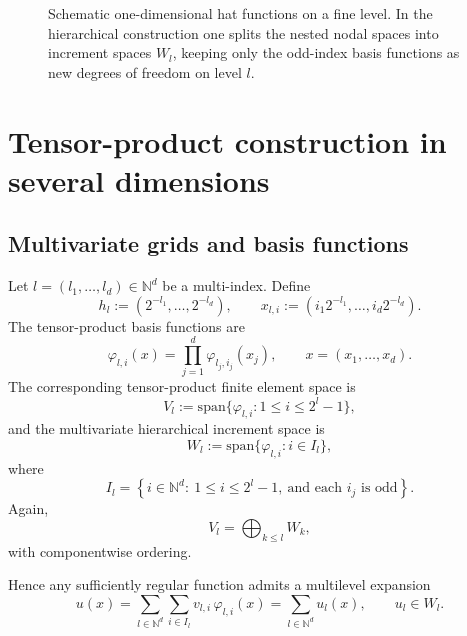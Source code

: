 \documentclass[11pt,a4paper]{report}
\begin{document}
\begin{figure}[ht]
\centering
{}
\caption{Schematic one-dimensional hat functions on a fine level. In the hierarchical construction one splits the nested nodal spaces into increment spaces $W_l$, keeping only the odd-index basis functions as new degrees of freedom on level $l$.}
\label{fig:1d-hats}
\end{figure}

\section{Tensor-product construction in several dimensions}

\subsection{Multivariate grids and basis functions}

Let $l=(l_1,\dots,l_d)\in\mathbb{N}^d$ be a multi-index. Define
$$
h_l := (2^{-l_1},\dots,2^{-l_d}),
\qquad
x_{l,i} := (i_1 2^{-l_1},\dots,i_d 2^{-l_d}).
$$
The tensor-product basis functions are
$$
\varphi_{l,i}(x)
=
\prod_{j=1}^d \varphi_{l_j,i_j}(x_j),
\qquad x=(x_1,\dots,x_d).
$$
The corresponding tensor-product finite element space is
$$
V_l := \mathrm{span}\{\varphi_{l,i}: 1\le i \le 2^l-1\},
$$
and the multivariate hierarchical increment space is
$$
W_l := \mathrm{span}\{\varphi_{l,i}: i\in I_l\},
$$
where
$$
I_l
=
\left\{
i\in\mathbb{N}^d:\ 1\le i \le 2^l-1,\ \text{and each } i_j \text{ is odd}
\right\}.
$$
Again,
$$
V_l = \bigoplus_{k\le l} W_k,
$$
with componentwise ordering.

Hence any sufficiently regular function admits a multilevel expansion
$$
u(x)
=
\sum_{l\in\mathbb{N}^d} \sum_{i\in I_l} v_{l,i}\,\varphi_{l,i}(x)
=
\sum_{l\in\mathbb{N}^d} u_l(x),
\qquad
u_l\in W_l.
$$
\end{document}
